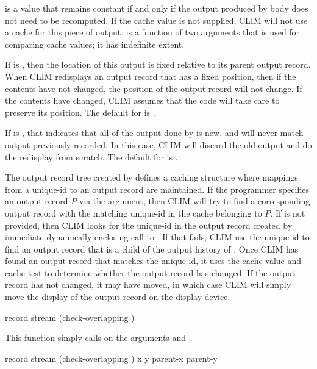  is a value that remains constant if and only if the output
produced by body does not need to be recomputed.  If the cache value is not
supplied, CLIM will not use a cache for this piece of output.  
is a function of two arguments that is used for comparing cache values; it has
indefinite extent.

If  is , then the location of this output is
fixed relative to its parent output record.  When CLIM redisplays an output
record that has a fixed position, then if the contents have not changed, the
position of the output record will not change.  If the contents have changed,
CLIM assumes that the code will take care to preserve its position.  The default
for  is .

If  is , that indicates that all of the output done by
 is new, and will never match output previously recorded.  In this
case, CLIM will discard the old output and do the redisplay from scratch.  The
default for  is .

The output record tree created by  defines a caching
structure where mappings from a unique-id to an output record are maintained.
If the programmer specifies an output record $P$ via the
 argument, then CLIM will try to find a corresponding output
record with the matching unique-id in the cache belonging to $P$.  If 
 is not provided, then CLIM looks for the unique-id in the
output record created by immediate dynamically enclosing call to
.  If that fails, CLIM use the unique-id to find an output
record that is a child of the output history of .  Once CLIM has
found an output record that matches the unique-id, it uses the cache value and
cache test to determine whether the output record has changed.  If the output
record has not changed, it may have moved, in which case CLIM will simply move
the display of the output record on the display device.


 {record stream \key (check-overlapping )}

This function simply calls  on the arguments
 and .

 {record stream
                                       \optional (check-overlapping ) 
                                                 x y parent-x parent-y}  


